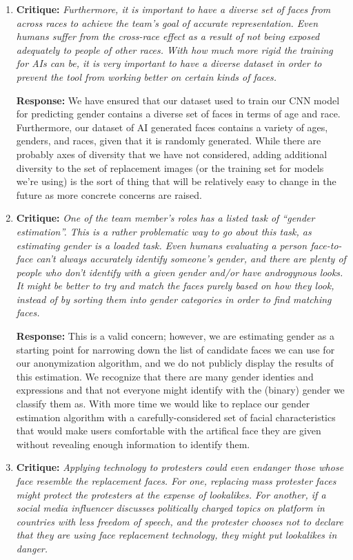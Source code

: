 \begin{enumerate}
    \item \textbf{Critique:} \textit{Furthermore, it is important to have a diverse set of faces from across races to
    achieve the team’s goal of accurate representation. Even humans suffer from the cross-race effect as a result of not being exposed adequately to people of other
    races. With how much more rigid the training for AIs can be, it is very important
    to have a diverse dataset in order to prevent the tool from working better on certain
    kinds of faces.}

    \textbf{Response:} We have ensured that our dataset used to train our CNN model for predicting gender contains a diverse set of faces
    in terms of age and race. Furthermore, our dataset of AI generated faces contains a variety of ages, genders, and races, given
    that it is randomly generated. While there are probably axes of diversity that we have not considered, adding additional diversity to the set of replacement images (or the training set for models we’re using) is the sort of thing that will be relatively easy to change in the future as more concrete concerns are raised.
    \item \textbf{Critique:} \textit{One of the team member’s roles has a listed task of “gender estimation”. This is a
    rather problematic way to go about this task, as estimating gender is a loaded task.
    Even humans evaluating a person face-to-face can’t always accurately identify
    someone’s gender, and there are plenty of people who don’t identify with a given
    gender and/or have androgynous looks. It might be better to try and match the faces
    purely based on how they look, instead of by sorting them into gender categories
    in order to find matching faces.}

    \textbf{Response:} This is a valid concern; however, we are estimating gender as a starting point for narrowing down the list of candidate faces we can use
    for our anonymization algorithm, and we do not publicly display the results of this estimation. We recognize that there are many gender identies and expressions and that not everyone might identify
    with the (binary) gender we classify them as. With more time we would like to replace our gender estimation algorithm with a carefully-considered set of facial characteristics that would make users comfortable with the artifical face they are given without revealing enough information to identify them.

    \item \textbf{Critique:} \textit{Applying technology to protesters could even endanger those whose face resemble
    the replacement faces. For one, replacing mass protester faces might protect the
    protesters at the expense of lookalikes. For another, if a social media influencer
    discusses politically charged topics on platform in countries with less freedom of
    speech, and the protester chooses not to declare that they are using face replacement
    technology, they might put lookalikes in danger.}


\end{enumerate}
